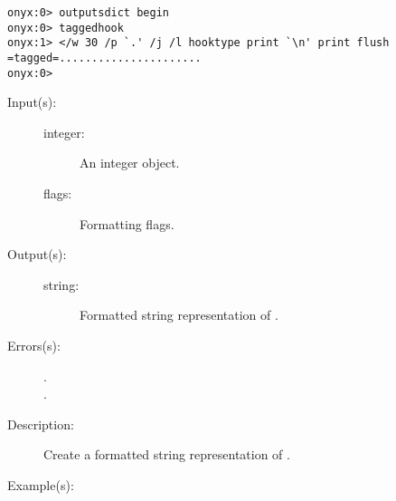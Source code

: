 \begin{description}
\begin{description}
\begin{verbatim}
onyx:0> outputsdict begin
onyx:0> taggedhook
onyx:1> </w 30 /p `.' /j /l hooktype print `\n' print flush
=tagged=......................
onyx:0>
		\end{verbatim}
	\end{description}
\label{outputsdict:integertype}
\item[{\onyxop{integer flags}{integertype}{string}}: ]
	\begin{description}\item[]
	\item[Input(s): ]
		\begin{description}\item[]
		\item[integer: ]
			An integer object.
		\item[flags: ]
			Formatting flags.
		\end{description}
	\item[Output(s): ]
		\begin{description}\item[]
		\item[string: ]
			Formatted string representation of .
		\end{description}
	\item[Errors(s): ]
		\begin{description}\item[]
		\item[.]
		\item[.]
		\end{description}
	\item[Description: ]
		Create a formatted string representation of .
	\item[Example(s): ]\begin{verbatim}


\end{verbatim}
\end{description}
\end{description}
